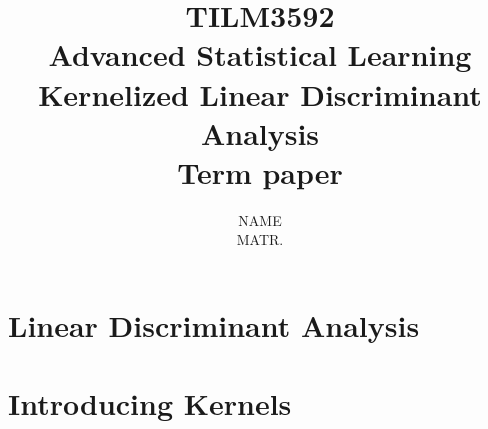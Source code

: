 \documentclass[a4paper, 12pt]{scrartcl}
\title{{\Large \textbf{TILM3592\\Advanced Statistical Learning}}\\
	{\LARGE \textbf{Kernelized Linear Discriminant Analysis}}\\
	{\Large \bfseries Term paper}}
\author{{\large NAME}\\
{ MATR.}}
\date{}
\begin{document}
\maketitle


\section{Linear Discriminant Analysis}

\section{Introducing Kernels}
\end{document}
